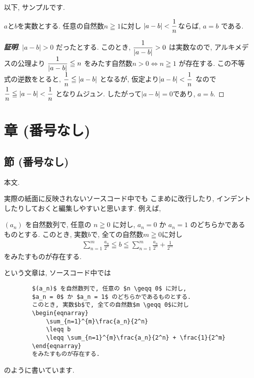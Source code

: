 以下, サンプルです. 

\begin{Proposition}
    $a$と$b$を実数とする. 任意の自然数$n\geqq1$に対し
    $\displaystyle|a-b|<\frac{1}{n}$ならば, $a=b$ である. 
\end{Proposition}

\begin{proof}[{\bf 証明}]
    $|a-b|>0$ だったとする. 
    このとき, $\displaystyle\frac{1}{|a-b|}>0$ は実数なので, 
    アルキメデスの公理より
    $\displaystyle \frac{1}{\left|a-b\right|}\leqq n$ 
    をみたす自然数$n>0 \Leftrightarrow n\geqq1$
    が存在する. この不等式の逆数をとると, 
    $\displaystyle \frac{1}{n}\leqq |a-b|$
    となるが, 仮定より$\displaystyle|a-b| < \frac{1}{n}$
    なので
    $\displaystyle \frac{1}{n}\leqq|a-b| < \frac{1}{n}$
    となりムジュン. したがって$|a-b|=0$であり, $a=b$.
  \end{proof}

\section*{章 (番号なし) }

\subsection*{節 (番号なし) }

本文. 

実際の紙面に反映されないソースコード中でも
こまめに改行したり, 
インデントしたりしておくと編集しやすいと思います. 
例えば, 
\begin{screen}
    $(a_n)$ を自然数列で, 任意の $n \geqq 0$ に対し, 
    $a_n = 0$ か $a_n = 1$ のどちらかであるものとする. 
    このとき, 実数$b$で, 全ての自然数$m \geqq 0$に対し
    \begin{eqnarray}
        \sum_{n=1}^{m}\frac{a_n}{2^n} 
        \leqq b 
        \leqq \sum_{n=1}^{m}\frac{a_n}{2^n} + \frac{1}{2^m}
    \end{eqnarray}
    をみたすものが存在する. 
\end{screen}
という文章は, ソースコード中では
\begin{screen}
    \begin{verbatim}
        $(a_n)$ を自然数列で, 任意の $n \geqq 0$ に対し, 
        $a_n = 0$ か $a_n = 1$ のどちらかであるものとする. 
        このとき, 実数$b$で, 全ての自然数$m \geqq 0$に対し
        \begin{eqnarray}
            \sum_{n=1}^{m}\frac{a_n}{2^n} 
            \leqq b 
            \leqq \sum_{n=1}^{m}\frac{a_n}{2^n} + \frac{1}{2^m}
        \end{eqnarray}
        をみたすものが存在する. \end{verbatim}
\end{screen}
のように書いています. 

